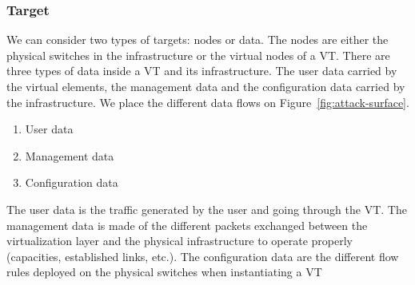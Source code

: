 \subsubsection{Target}
We can consider two types of targets: nodes or data.
The nodes are either the physical switches in the infrastructure or the virtual nodes of a VT.
There are three types of data inside a VT and its infrastructure.
The user data carried by the virtual elements, the management data and the configuration data carried by the infrastructure. 
We place the different data flows on Figure~\ref{fig:attack-surface}.
\begin{enumerate}
\item User data
\item Management data
\item Configuration data
\end{enumerate}

The user data is the traffic generated by the user and going through the VT.
The management data is made of the different packets exchanged between the virtualization layer and the physical infrastructure to operate properly (capacities, established links, etc.).
The configuration data are the different flow rules deployed on the physical switches when instantiating a VT%

